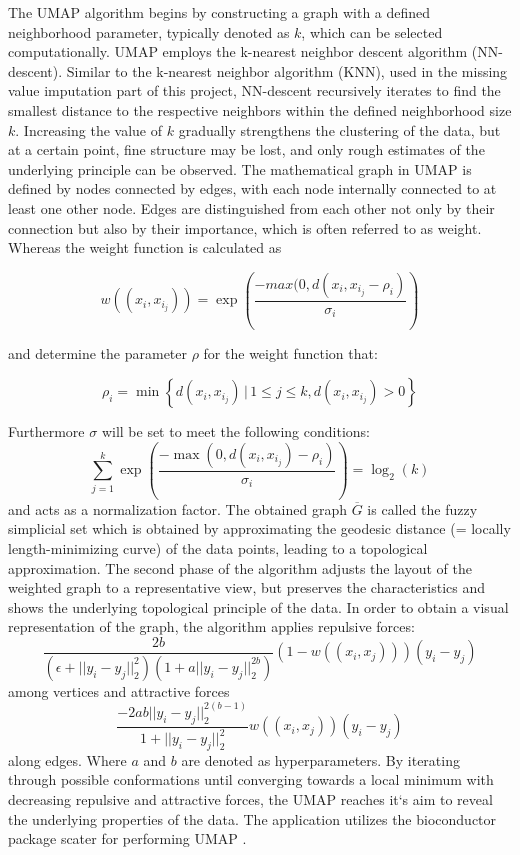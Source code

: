 \documentclass[
  11pt,
]{article}
\begin{document}
\citep{McInnes2018}

The UMAP algorithm begins by constructing a graph with a defined neighborhood parameter, typically denoted as \(k\), which can be selected computationally. UMAP employs the k-nearest neighbor descent algorithm (NN-descent). Similar to the k-nearest neighbor algorithm (KNN), used in the missing value imputation part of this project, NN-descent recursively iterates to find the smallest distance to the respective neighbors within the defined neighborhood size \(k\). Increasing the value of \(k\) gradually strengthens the clustering of the data, but at a certain point, fine structure may be lost, and only rough estimates of the underlying principle can be observed.
The mathematical graph in UMAP is defined by nodes connected by edges, with each node internally connected to at least one other node. Edges are distinguished from each other not only by their connection but also by their importance, which is often referred to as weight. Whereas the weight function is calculated as

\[w((x_i, x_{i_{j}})) = \exp(\frac{-max(0,d(x_{i},x_{i_{j}}-\rho_{i})}{\sigma_{i}})\]

and determine the parameter \(\rho\) for the weight function that:

\[\rho_i=\min \left\{ d(x_i,x_{i_{j}}) \,|\, 1 \leq j \leq k, d(x_i, x_{i_{j}}) > 0 \right\}\]

Furthermore \(\sigma\) will be set to meet the following conditions:
\[\sum_{j=1}^{k} \exp ( \frac{ -\max(0, d(x_{i}, x_{i_{j}}) - \rho_i)} { \sigma_i } ) = \log_2(k)\]
and acts as a normalization factor. The obtained graph \(\overline{G}\) is called the fuzzy simplicial set which is obtained by approximating the geodesic distance (= locally length-minimizing curve) of the data points, leading to a topological approximation.
The second phase of the algorithm adjusts the layout of the weighted graph to a representative view, but preserves the characteristics and shows the underlying topological principle of the data. In order to obtain a visual representation of the graph, the algorithm applies repulsive forces:
\[\frac{2b}{(\epsilon + ||y_i-y_j||_{2}^{2})(1+a||y_i-y_j||_{2}^{2b})}(1-w((x_i,x_j)))(y_i-y_j)\]
among vertices and attractive forces
\[\frac{ -2ab || y_i -y_j||_{2}^{2(b-1)} }{1+||y_i-y_j||_{2}^{2}} w((x_i,x_j))(y_i-y_j)\]
along edges. Where \(a\) and \(b\) are denoted as hyperparameters. By iterating through possible conformations until converging towards a local minimum with decreasing repulsive and attractive forces, the UMAP reaches it`s aim to reveal the underlying properties of the data. The application utilizes the bioconductor package scater for performing UMAP \citep{McCarthy2017}.
\end{document}
